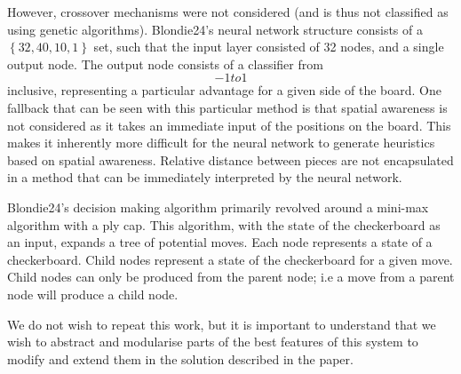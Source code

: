 \documentclass[12pt,a4paper]{article}
\begin{document}
        However, crossover mechanisms were not considered (and is thus not classified as using genetic algorithms). Blondie24's neural network structure consists of a $\left\{ 32,40,10,1 \right\}$ set, such that the input layer consisted of 32 nodes, and a single output node. The output node consists of a classifier from \[-1 to 1\] inclusive, representing a particular advantage for a given side of the board. One fallback that can be seen with this particular method is that spatial awareness is not considered as it takes an immediate input of the positions on the board. This makes it inherently more difficult for the neural network to generate heuristics based on spatial awareness. Relative distance between pieces are not encapsulated in a method that can be immediately interpreted by the neural network.

        Blondie24's decision making algorithm primarily revolved around a mini-max algorithm with a ply cap. This algorithm, with the state of the checkerboard as an input, expands a tree of potential moves. Each node represents a state of a checkerboard. Child nodes represent a state of the checkerboard for a given move. Child nodes can only be produced from the parent node; i.e a move from a parent node will produce a child node. 
    
%    
%    

        We do not wish to repeat this work, but it is important to understand that we wish to abstract and modularise parts of the best features of this system to modify and extend them in the solution described in the paper.
\end{document}
